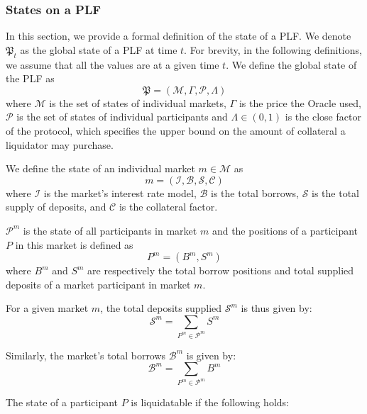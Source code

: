\subsubsection{States on a PLF}
In this section, we provide a formal definition of the state of a PLF.
We denote $\mathfrak{P}_t$ as the global state of a PLF at time $t$.
For brevity, in the following definitions, we assume that all the values are at a given time $t$.
We define the global state of the PLF as
\[
  \mathfrak{P} = (\mathcal{M},\Gamma, \mathcal{P}, \Lambda)
\]
where $\mathcal{M}$ is the set of states of individual markets, $\Gamma$ is the price the Oracle used, $\mathcal{P}$ is the set of states of individual participants and $\Lambda \in (0, 1)$ is the close factor of the protocol, which specifies the upper bound on the amount of collateral a liquidator may purchase.

We define the state of an individual market
$m \in \mathcal{M}$ as 
$$m = (\mathcal{I}, \mathcal{B}, \mathcal{S}, \mathcal{C})$$
where
$\mathcal{I}$ is the market's interest rate model,
$\mathcal{B}$ is the total borrows,
$\mathcal{S}$ is the total supply of deposits,
and $\mathcal{C}$ is the collateral factor.

$\mathcal{P}^m$ is the state of all participants in market $m$ and the positions of a participant $P$ in this market is defined as
\[
  P^m = (B^m,S^m)
\]
where $B^m$ and $S^m$ are respectively the total borrow positions and total supplied deposits of a market participant in market $m$.

For a given market $m$, the total deposits supplied $\mathcal{S}^m$ is thus given by:
\begin{equation}
    \mathcal{S}^m = \sum_{P^m\in \mathcal{P}^m} S^m
\end{equation}

Similarly, the market's total borrows $\mathcal{B}^m$ is given by:
\begin{equation}
    \mathcal{B}^m = \sum_{P^m\in \mathcal{P}^m} B^m
\end{equation}

The state of a participant $P$ is liquidatable if the following holds: 

